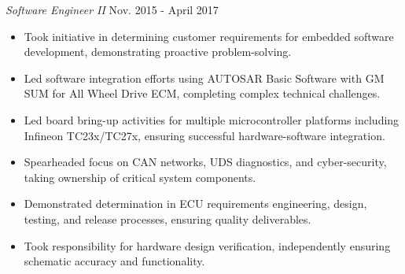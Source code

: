 \noindent
\textit{Software Engineer II} \hfill Nov. 2015 - April 2017 \\
\begin{itemize}[leftmargin=*,noitemsep,topsep=3pt]
    \item Took initiative in determining customer requirements for embedded software development, demonstrating proactive problem-solving.
    \item Led software integration efforts using AUTOSAR Basic Software with GM SUM for All Wheel Drive ECM, completing complex technical challenges.
    \item Led board bring-up activities for multiple microcontroller platforms including Infineon TC23x/TC27x, ensuring successful hardware-software integration.
    \item Spearheaded focus on CAN networks, UDS diagnostics, and cyber-security, taking ownership of critical system components.
    \item Demonstrated determination in ECU requirements engineering, design, testing, and release processes, ensuring quality deliverables.
    \item Took responsibility for hardware design verification, independently ensuring schematic accuracy and functionality.
\end{itemize}